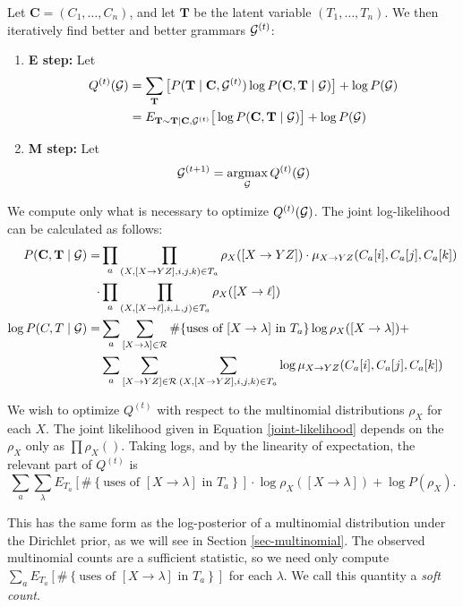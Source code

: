 \documentclass{article}
\begin{document}
Let $\mathbf{C} = (C_1,\dots,C_n)$, and let $\mathbf{T}$ be the latent
variable $(T_1,\dots,T_n)$. We then iteratively find better and better
grammars ${\mathcal G}^{(t)}$:
\begin{enumerate}
\item \textbf{E step:} Let 
  \begin{align*}
Q^{(t)}({\mathcal G}) &= \sum_{\mathbf{T}} \big[P(\mathbf{T}\mid \mathbf{C},
{\mathcal G}^{(t)}) \log P(\mathbf{C},\mathbf{T}\mid {\mathcal G}) \big] + \log
P({\mathcal G})\\
&= E_{\mathbf{T} \sim \mathbf{T} | \mathbf{C}, {\mathcal G}^{(t)}}\big[\log
P(\mathbf{C},\mathbf{T}\mid {\mathcal G}) \big] + \log P({\mathcal G})
  \end{align*}
\item \textbf{M step:} Let
$$ {\mathcal G}^{(t+1)} = \operatorname*{argmax}_{{\mathcal G}} Q^{(t)}({\mathcal G})$$
\end{enumerate}

We compute only what is necessary to optimize $Q^{(t)}({\mathcal G})$. The
joint log-likelihood can be calculated as follows:
\begin{align*}
  P(\mathbf{C},\mathbf{T}\mid {\mathcal G}) = &\prod_a \prod_{(X,[X\to YZ],i,j,k)\in T_a} \rho_X([X\to YZ]) \cdot \mu_{X\to YZ}(C_a[i], C_a[j], C_a[k]) \\
  \cdot &\prod_a \prod_{(X,[X\to \ell],i,\bot,j)\in T_a} \rho_X([X\to \ell]) \\
  \log P(C,T\mid {\mathcal G}) = &\sum_a \sum_{[X\to \lambda] \in {\mathcal R}}
  \#\{\mbox{uses of }[X\to \lambda]\mbox{ in } T_a \} \log \rho_X([X\to \lambda]) +\\
  &\sum_a \sum_{[X\to YZ] \in {\mathcal R}} \sum_{(X, [X\to YZ], i, j,k)\in T_a} \log
  \mu_{X\to YZ}(C_a[i], C_a[j], C_a[k])\\
\end{align*}

We wish to optimize $Q^{(t)}$ with respect to the multinomial
distributions $\rho_X$ for each $X$. The joint likelihood given in
Equation \ref{joint-likelihood} depends on the $\rho_X$ only as $\prod
\rho_X()$. Taking logs, and by the linearity of expectation, the
relevant part of $Q^{(t)}$ is
$$\sum_a \sum_\lambda E_{T_a}\left[ \#\left\{\mbox{uses of }[X\to
    \lambda] \mbox{ in }T_a \right\}\right]\cdot \log \rho_{X}([X\to \lambda]) +
\log P(\rho_X).$$

This has the same form as the log-posterior of a multinomial
distribution under the Dirichlet prior, as we will see in Section
\ref{sec-multinomial}. The observed multinomial counts are a
sufficient statistic, so we need only compute $\sum_a E_{T_a}\left[
  \#\left\{\mbox{uses of }[X\to \lambda] \mbox{ in } T_a
  \right\}\right]$ for each $\lambda$. We call this quantity a
\emph{soft count}.
\end{document}
